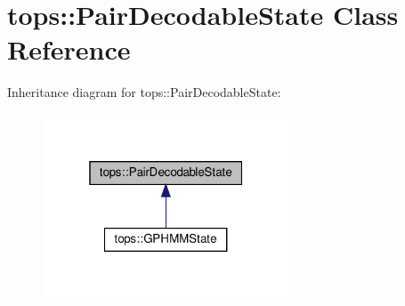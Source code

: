 \hypertarget{classtops_1_1PairDecodableState}{}\section{tops\+:\+:Pair\+Decodable\+State Class Reference}
\label{classtops_1_1PairDecodableState}


Inheritance diagram for tops\+:\+:Pair\+Decodable\+State\+:
\nopagebreak
\begin{figure}[H]
\begin{center}
\leavevmode
\includegraphics[width=208pt]{classtops_1_1PairDecodableState__inherit__graph}
\end{center}
\end{figure}
